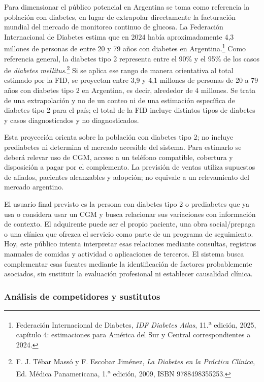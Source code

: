 Para dimensionar el público potencial en Argentina se toma como referencia la población con diabetes, en lugar de extrapolar directamente la facturación mundial del mercado de monitoreo continuo de glucosa. La Federación Internacional de Diabetes estima que en 2024 había aproximadamente 4,3 millones de personas de entre 20 y 79 años con diabetes en Argentina.\footnote{Federación Internacional de Diabetes, \textit{IDF Diabetes Atlas}, 11.\textsuperscript{a} edición, 2025, capítulo 4: estimaciones para América del Sur y Central correspondientes a 2024.} Como referencia general, la diabetes tipo 2 representa entre el 90\% y el 95\% de los casos de \textit{diabetes mellitus}.\footnote{F. J. Tébar Massó y F. Escobar Jiménez, \textit{La Diabetes en la Práctica Clínica}, Ed. Médica Panamericana, 1.\textsuperscript{a} edición, 2009, ISBN 9788498355253.} Si se aplica ese rango de manera orientativa al total estimado por la FID, se proyectan entre 3,9 y 4,1 millones de personas de 20 a 79 años con diabetes tipo 2 en Argentina, es decir, alrededor de 4 millones. Se trata de una extrapolación y no de un conteo ni de una estimación específica de diabetes tipo 2 para el país; el total de la FID incluye distintos tipos de diabetes y casos diagnosticados y no diagnosticados.

Esta proyección orienta sobre la población con diabetes tipo 2; no incluye prediabetes ni determina el mercado accesible del sistema. Para estimarlo se deberá relevar uso de CGM, acceso a un teléfono compatible, cobertura y disposición a pagar por el complemento. La previsión de ventas utiliza supuestos de aliados, pacientes alcanzables y adopción; no equivale a un relevamiento del mercado argentino.

El usuario final previsto es la persona con diabetes tipo 2 o prediabetes que ya usa o considera usar un CGM y busca relacionar sus variaciones con información de contexto. El adquirente puede ser el propio paciente, una obra social/prepaga o una clínica que ofrezca el servicio como parte de un programa de seguimiento. Hoy, este público intenta interpretar esas relaciones mediante consultas, registros manuales de comidas y actividad o aplicaciones de terceros. El sistema busca complementar esas fuentes mediante la identificación de factores probablemente asociados, sin sustituir la evaluación profesional ni establecer causalidad clínica.

\subsubsection{Análisis de competidores y sustitutos}

